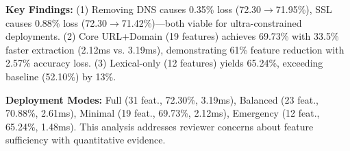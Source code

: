 \textbf{Key Findings:}
(1) Removing DNS causes 0.35\% loss (72.30$\rightarrow$71.95\%), SSL causes 0.88\% loss (72.30$\rightarrow$71.42\%)—both viable for ultra-constrained deployments.
(2) Core URL+Domain (19 features) achieves 69.73\% with 33.5\% faster extraction (2.12ms vs. 3.19ms), demonstrating 61\% feature reduction with 2.57\% accuracy loss.
(3) Lexical-only (12 features) yields 65.24\%, exceeding baseline (52.10\%) by 13\%.

\textbf{Deployment Modes:} Full (31 feat., 72.30\%, 3.19ms), Balanced (23 feat., 70.88\%, 2.61ms), Minimal (19 feat., 69.73\%, 2.12ms), Emergency (12 feat., 65.24\%, 1.48ms). This analysis addresses reviewer concerns about feature sufficiency with quantitative evidence.